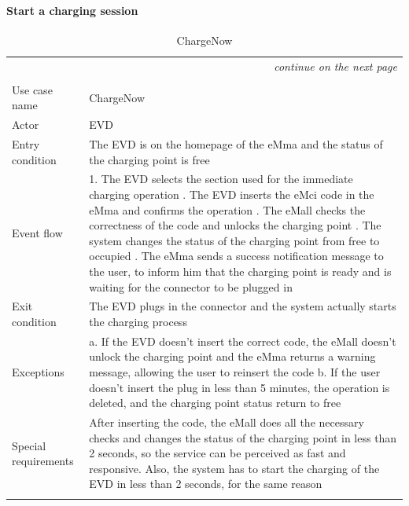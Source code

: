 \paragraph{Start a charging session}
\begin{center}
    \begin{longtable}{p{4cm} p{11cm}}
    \multicolumn{2}{r}{\itshape{continue on the next page}}\\
    \endfoot 
    \\
    \endlastfoot
    \hline
     Use case name &  ChargeNow\\
     \hline
     Actor & EVD \\
     \hline
     Entry condition & The EVD is on the homepage of the eMma and the status of the charging point is free \\
     \hline
     Event flow &   
        1. The EVD selects the section used for the immediate charging operation \newline
        2. The EVD inserts the eMci code in the eMma and confirms the operation \newline
        3. The eMall checks the correctness of the code and unlocks the charging point \newline
        4. The system changes the status of the charging point from free to occupied \newline   
        5. The eMma sends a success notification message to the user, to inform him that the charging point is ready and is waiting for the connector to be plugged in\\
     \hline
     Exit condition &  The EVD plugs in the connector and the system actually starts the charging process \\
     \hline
     Exceptions &   
        a. If the EVD doesn't insert the correct code, the eMall doesn't unlock the charging point and the eMma returns a warning message, allowing the user to reinsert the code\newline
        b. If the user doesn't insert the plug in less than 5 minutes, the operation is deleted, and the charging point status return to free \\ 
     \hline
     Special requirements & After inserting the code, the eMall does all the necessary checks and changes the status of the charging point in less than 2 seconds, so the service can be perceived as fast and responsive. Also, the system has to start the charging of the EVD in less than 2 seconds, for the same reason \\
     \hline
    \caption{ChargeNow}
    \label{tab:ChargeNow}
    \end{longtable}
\end{center}

